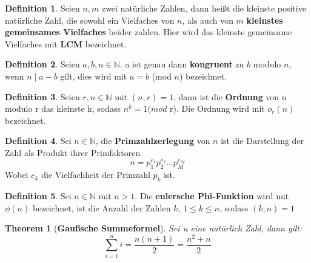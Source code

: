 \documentclass[12pt,oneside]{article}
\newtheorem{theorem}{Theorem}[section]
\theoremstyle{remark}
\theoremstyle{definition}
\newtheorem{definition}{Definition}[section]
\begin{document}
\smallskip

\begin{definition}
Seien $n, m$ zwei natürliche Zahlen, dann heißt die kleinste positive natürliche Zahl, die sowohl ein Vielfaches von $n$, als auch von $m$ \textbf{kleinstes gemeinsames Vielfaches} beider zahlen. Hier wird das kleinste gemeinsame Vielfaches mit \textbf{LCM} bezeichnet.
\end{definition}

\smallskip 

\begin{definition}\label{Df_3}
Seien $a, b, n \in \mathbb{N}$. a ist genau dann \textbf{kongruent} zu $b$ modulo $n$, wenn $n \mid a - b $ gilt, dies wird mit $a = b$ (mod $n$) bezeichnet.  
\end{definition}

\smallskip 

\begin{definition}\label{Df_4}
Seien $r,n \in \mathbb{N}$ mit $(n,r) = 1$, dann ist die \textbf{Ordnung} von n modulo r das kleinste k, sodass $n^k = 1 (mod $ r). Die Ordnung wird mit $o_{r}(n)$ bezeichnet.
\end{definition}

\smallskip


\begin{definition}\label{Df_5}
Sei $n \in \mathbb{N}$, die \textbf{Primzahlzerlegung} von $n$ ist die Darstellung der Zahl als Produkt ihrer Primfaktoren \newline
\begin{equation}
    n = p_{1}^{e_{1}}p_{2}^{e_{2}}...p_{M}^{e_{M}}
\end{equation}
Wobei $e_{k}$ die Vielfachheit der Primzahl $p_{k}$ ist.
\end{definition}

\smallskip


\begin{definition}\label{Df_6}
Sei $n \in \mathbb{N}$ mit $n > 1$. Die \textbf{eulersche Phi-Funktion} wird mit $\phi(n)$ bezeichnet, ist die Anzahl der Zahlen $k, \, 1 \leq k \leq n$, sodass $(k,n) = 1$
\end{definition}

\smallskip

\begin{theorem}[\textbf{Gaußsche Summeformel}]\label{gauss}
Sei n eine natürlich Zahl, dann gilt:
\begin{equation}
    \sum_{i = 1}^{n} i = \frac{n (n + 1)}{2} = \frac{n^2 + n}{2} 
\end{equation}
\end{theorem}
\end{document}
